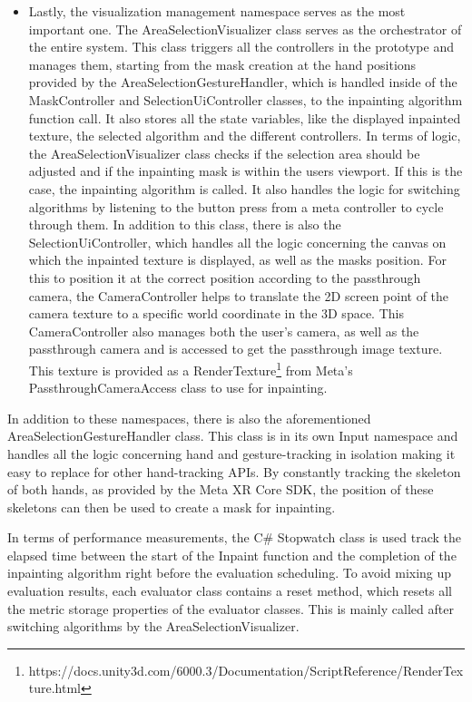\begin{itemize}
    \item Lastly, the visualization management namespace serves as the most important one. The AreaSelectionVisualizer class serves as the orchestrator of the entire system. This class triggers all the controllers in the prototype and manages them, starting from the mask creation at the hand positions provided by the AreaSelectionGestureHandler, which is handled inside of the MaskController and SelectionUiController classes, to the inpainting algorithm function call. It also stores all the state variables, like the displayed inpainted texture, the selected algorithm and the different controllers.
    In terms of logic, the AreaSelectionVisualizer class checks if the selection area should be adjusted and if the inpainting mask is within the users viewport. If this is the case, the inpainting algorithm is called. It also handles the logic for switching algorithms by listening to the button press from a meta controller to cycle through them.
    In addition to this class, there is also the SelectionUiController, which handles all the logic concerning the canvas on which the inpainted texture is displayed, as well as the masks position. For this to position it at the correct position according to the passthrough camera, the CameraController helps to translate the 2D screen point of the camera texture to a specific world coordinate in the 3D space. This CameraController also manages both the user's camera, as well as the passthrough camera and is accessed to get the passthrough image texture. This texture is provided as a RenderTexture\footnote{https://docs.unity3d.com/6000.3/Documentation/ScriptReference/RenderTexture.html} from Meta's PassthroughCameraAccess class to use for inpainting.

\end{itemize}

In addition to these namespaces, there is also the aforementioned AreaSelectionGestureHandler class. This class is in its own Input namespace and handles all the logic concerning hand and gesture-tracking in isolation making it easy to replace for other hand-tracking APIs. 
By constantly tracking the skeleton of both hands, as provided by the Meta XR Core SDK, the position of these skeletons can then be used to create a mask for inpainting.

In terms of performance measurements, the C\string# Stopwatch class is used track the elapsed time between the start of the Inpaint function and the completion of the inpainting algorithm right before the evaluation scheduling. 
To avoid mixing up evaluation results, each evaluator class contains a reset method, which resets all the metric storage properties of the evaluator classes. This is mainly called after switching algorithms by the AreaSelectionVisualizer.

